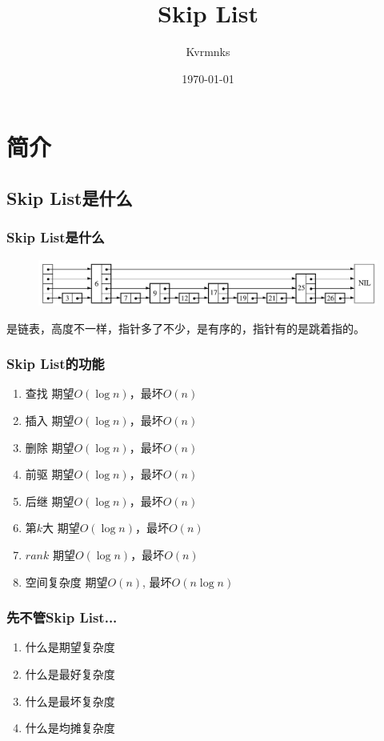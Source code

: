 \documentclass{beamer}
\title{Skip List}
\author{Kvrmnks}
\date{\today}
\begin{document}
	\begin{frame}
		\titlepage
	\end{frame}
	\section{简介}
	\subsection{Skip List是什么}

	\begin{frame}
		\frametitle{Skip List是什么}
		\begin{figure}[H]
			\centering
			\includegraphics[scale=0.25]{./img/what_skip_list_is.jpg}
			
		\end{figure}
		\pause
		是链表，高度不一样，指针多了不少，是有序的，指针有的是跳着指的。
	\end{frame}

	\begin{frame}
		\frametitle{Skip List的功能}
		\begin{enumerate}
			\item 查找 \quad 期望$O(\log n)$，最坏$O(n)$
			\item 插入 \quad 期望$O(\log n)$，最坏$O(n)$
			\item 删除 \quad 期望$O(\log n)$，最坏$O(n)$
			\item 前驱 \quad 期望$O(\log n)$，最坏$O(n)$
			\item 后继 \quad 期望$O(\log n)$，最坏$O(n)$
			\item 第$k$大 \quad 期望$O(\log n)$，最坏$O(n)$
			\item $rank$ \quad 期望$O(\log n)$，最坏$O(n)$
			\item 空间复杂度 \quad 期望$O(n)$, 最坏$O(n\log n)$
		\end{enumerate}
	\end{frame}
	\begin{frame}
		\frametitle{先不管Skip List...}
		\begin{enumerate}
			\item 什么是期望复杂度
			\item 什么是最好复杂度
			\item 什么是最坏复杂度
			\item 什么是均摊复杂度
		\end{enumerate}
	\end{frame}
\end{document}
